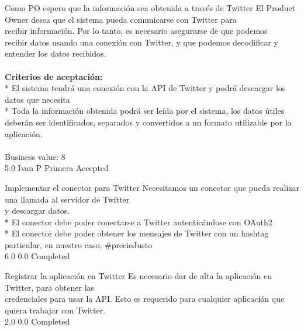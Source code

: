 \vspace{20pt}

	{Como PO espero que la información sea obtenida a través de Twitter} %
	{El Product Owner desea que el sistema pueda comunicarse con Twitter para\\
recibir información. Por lo tanto, es necesario asegurarse de que podemos\\
recibir datos usando una conexión con Twitter, y que podemos decodificar y\\
entender los datos recibidos.\\
  \\
\textbf{Criterios de aceptación:}\\
* El sistema tendrá una conexión con la API de Twitter y podrá descargar los datos que necesita  \\
* Toda la información obtenida podrá ser leída por el sistema, los datos útiles deberán ser identificados, separados y convertidos a un formato utilizable por la aplicación. \\
  \\
Business value: 8\\
} %
	{} %
	{5.0} %
	{Ivan P} %
	{Primera} %
	{Accepted} %

		{Implementar el conector para Twitter} %
		{Necesitamos un conector que pueda realizar una llamada al servidor de Twitter\\
y descargar datos.\\
* El conector debe poder conectarse a Twitter autenticándose con OAuth2\\
* El conector debe poder obtener los mensajes de Twitter con un hashtag particular, en nuestro caso, \#precioJusto\\
} %
		{6.0} %
		{} %
		{0.0} %
		{Completed} %

		{Registrar la aplicación en Twitter} %
		{Es necesario dar de alta la aplicación en Twitter, para obtener las\\
credenciales para usar la API. Esto es requerido para cualquier aplicación que\\
quiera trabajar con Twitter.\\
} %
		{2.0} %
		{} %
		{0.0} %
		{Completed} %

